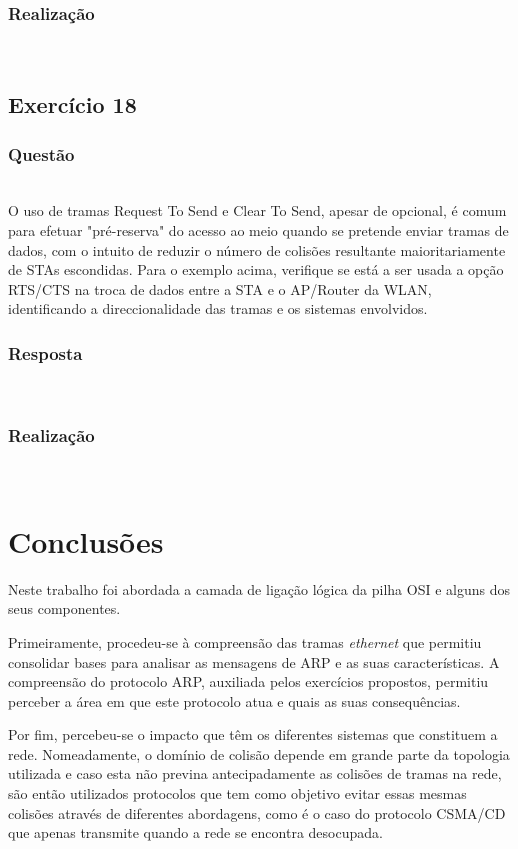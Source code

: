 \documentclass{llncs}
\begin{document}
\subsubsection{Realização}\rule[-10pt]{0pt}{10pt}\\



\clearpage
\subsection{Exercício 18}
\subsubsection{Questão}\rule[-10pt]{0pt}{10pt}\\

O uso de tramas Request To Send e Clear To Send, apesar de opcional, é comum para efetuar "pré-reserva" do acesso ao meio quando se pretende enviar tramas de dados, com o intuito de reduzir o número de colisões resultante maioritariamente de STAs escondidas. Para o exemplo acima, verifique se está a ser usada a opção RTS/CTS na troca de dados entre a STA e o AP/Router da WLAN, identificando a direccionalidade das tramas e os sistemas envolvidos.

\subsubsection{Resposta}\rule[-10pt]{0pt}{10pt}\\



\subsubsection{Realização}\rule[-10pt]{0pt}{10pt}\\



\clearpage

\section{Conclusões}

\hspace{5mm} Neste trabalho foi abordada a camada de ligação lógica da pilha OSI e alguns dos seus componentes. 

Primeiramente, procedeu-se à compreensão das tramas \textit{ethernet} que permitiu consolidar bases para analisar as mensagens de ARP e as suas características. A compreensão do protocolo ARP, auxiliada pelos exercícios propostos, permitiu perceber a área em que este protocolo atua e quais as suas consequências.

Por fim, percebeu-se o impacto que têm os diferentes sistemas que constituem a rede. Nomeadamente, o domínio de colisão depende em grande parte da topologia utilizada e caso esta não previna antecipadamente as colisões de tramas na rede, são então utilizados protocolos que tem como objetivo evitar essas mesmas colisões através de diferentes abordagens, como é o caso do protocolo CSMA/CD que apenas transmite quando a rede se encontra desocupada.



\end{document}
